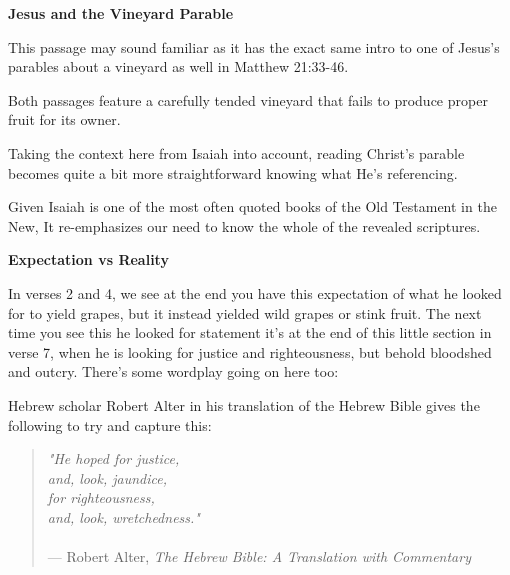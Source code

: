 \documentclass[11pt]{article}
\begin{document}
\vspace{3em}
{\large\bfseries Jesus and the Vineyard Parable}
\vspace{1em}

This passage may sound familiar as it has the exact same intro to one of Jesus's parables about a vineyard as well in Matthew 21:33-46.

Both passages feature a carefully tended vineyard that fails to produce proper fruit for its owner.

\vspace{1em}

Taking the context here from Isaiah into account, reading Christ's parable becomes quite a bit more straightforward knowing what He's referencing.

Given Isaiah is one of the most often quoted books of the Old Testament in the New, It re-emphasizes our need to know the whole of the revealed scriptures. 

\vspace{3em}
{\large\bfseries Expectation vs Reality}
\vspace{1em}


In verses 2 and 4, we see at the end you have this expectation of what he looked for to yield grapes, but it instead yielded wild grapes or stink fruit. The next time you see this he looked for statement it's at the end of this little section in verse 7, when he is looking for justice and righteousness, but behold bloodshed and outcry. There's some wordplay going on here too:



Hebrew scholar Robert Alter in his translation of the Hebrew Bible gives the following to try and capture this:

\begin{quote}
\textit{"He hoped for justice,\\ and, look, jaundice,\\ for righteousness,\\ and, look, wretchedness."}\\\\
\hfill --- Robert Alter, \textit{The Hebrew Bible: A Translation with Commentary}
\end{quote}
\end{document}
